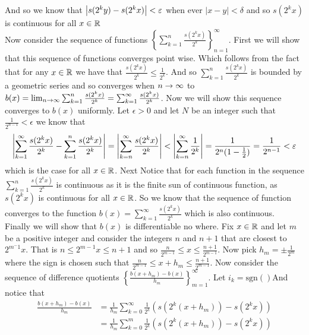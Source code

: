 \documentclass[12pt]{amsart}
\begin{document}
\begin{itemize}
      And so we know that $\left\vert s(2^ky)-s(2^kx) \right\vert<\varepsilon$ when ever $|x-y|<\delta$
      and so $s(2^kx)$ is continuous for all $x\in \mathbb{R}$\\

      Now consider the sequence of functions
      $\displaystyle{\left\{\sum_{k=1}^n\frac{s(2^kx)}{2^k}\right\}_{n=1}^{\infty}}$.
      First we will show that this sequence of functions converges point wise. 
      Which follows from the fact that for any $x\in \mathbb{R}$ we have that 
      $\frac{s(2^kx)}{2^k}\leq \frac{1}{2^k}$. And so $\sum_{k=1}^n\frac{s(2^kx)}{2^k}$ 
      is bounded by a geometric series and so converges when $n\rightarrow\infty$ to 
      $b(x)=\lim_{n\rightarrow\infty}\sum_{k=1}^n\frac{s(2^kx)}{2^k}=\sum_{k=1}^\infty\frac{s(2^kx)}{2^k}$. 
      Now we will show this sequence converges to $b(x)$ uniformly. Let
      $\epsilon>0$ and let $N$ be an integer such that $\frac{1}{2^{n-1}}<\epsilon$
      we know that
      \[\left\vert \sum_{k=1}^\infty\frac{s(2^kx)}{2^k}-\sum_{k=1}^n\frac{s(2^kx)}{2^k} \right\vert=\left\vert \sum_{k=n}^\infty\frac{s(2^kx)}{2^k} \right\vert<\left\vert \sum_{k=n}^\infty\frac{1}{2^k} \right\vert=\frac{1}{2^n(1-\frac{1}{2})}=\frac{1}{2^{n-1}}<\varepsilon\]
      which is the case for all $x\in\mathbb{R}$. Next Notice that for each function in the
      sequence $\sum_{k=1}^n\frac{s(2^kx)}{2^k}$ is continuous as it is the finite
      sun of continuous function, as $s(2^kx)$ is continuous for all $x\in\mathbb{R}$. So we
      know that the sequence of function converges to the function
      $b(x)=\sum_{k=1}^\infty\frac{s(2^kx)}{2^k}$ which is also continuous.\\

      Finally we will show that $b(x)$ is differentiable no where.
      Fix $x\in \mathbb{R}$ and let $m$ be a positive integer and consider the integers $n$ and $n+1$ that are closest to $2^{m^-1}x$. 
      That is $n\leq 2^{m-1}x\leq n+1$ and so $\frac{n}{2^{m-1}}\leq x\leq \frac{n+1}{2^{m-1}}$. Now pick $h_m=\pm\frac{1}{2^m}$ 
      where the sign is chosen such that $\frac{n}{2^{m-1}}\leq x+h_m\leq \frac{n+1}{2^{m-1}}$.
      Now consider the sequence of difference quotients $\left\{\frac{b(x+h_m)-b(x)}{h_m}\right\}_{m=1}^\infty$. Let $i_k=\text{sgn}()$And notice that 
      \begin{align}
         \frac{b(x+h_m)-b(x)}{h_m}&=\frac{1}{h_m}\sum_{k=0}^{\infty}\frac{1}{2^k}\left(s(2^k(x+h_m))-s(2^kx)\right)\\
         &=\frac{1}{h_m}\sum_{k=0}^{m}\frac{1}{2^k}\left(s(2^k(x+h_m))-s(2^kx)\right)
      \end{align}



\end{itemize}
\end{document}
